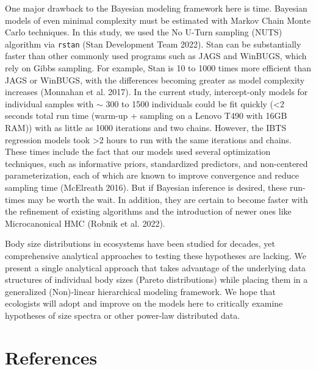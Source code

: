 \documentclass[
  12pt,
]{article}
\begin{document}
One major drawback to the Bayesian modeling framework here is time.
Bayesian models of even minimal complexity must be estimated with Markov
Chain Monte Carlo techniques. In this study, we used the No U-Turn
sampling (NUTS) algorithm via \texttt{rstan} (Stan Development Team
2022). Stan can be substantially faster than other commonly used
programs such as JAGS and WinBUGS, which rely on Gibbs sampling. For
example, Stan is 10 to 1000 times more efficient than JAGS or WinBUGS,
with the differences becoming greater as model complexity increases
(Monnahan et al. 2017). In the current study, intercept-only models for
individual samples with \(\sim\) 300 to 1500 individuals could be fit
quickly (\textless2 seconds total run time (warm-up + sampling on a
Lenovo T490 with 16GB RAM)) with as little as 1000 iterations and two
chains. However, the IBTS regression models took \textgreater2 hours to
run with the same iterations and chains. These times include the fact
that our models used several optimization techniques, such as
informative priors, standardized predictors, and non-centered
parameterization, each of which are known to improve convergence and
reduce sampling time (McElreath 2016). But if Bayesian inference is
desired, these run-times may be worth the wait. In addition, they are
certain to become faster with the refinement of existing algorithms and
the introduction of newer ones like Microcanonical HMC (Robnik et al.
2022).

Body size distributions in ecosystems have been studied for decades, yet
comprehensive analytical approaches to testing these hypotheses are
lacking. We present a single analytical approach that takes advantage of
the underlying data structures of individual body sizes (Pareto
distributions) while placing them in a generalized (Non)-linear
hierarchical modeling framework. We hope that ecologists will adopt and
improve on the models here to critically examine hypotheses of size
spectra or other power-law distributed data.

\hypertarget{references}{%
\section{References}\label{references}}
\end{document}
